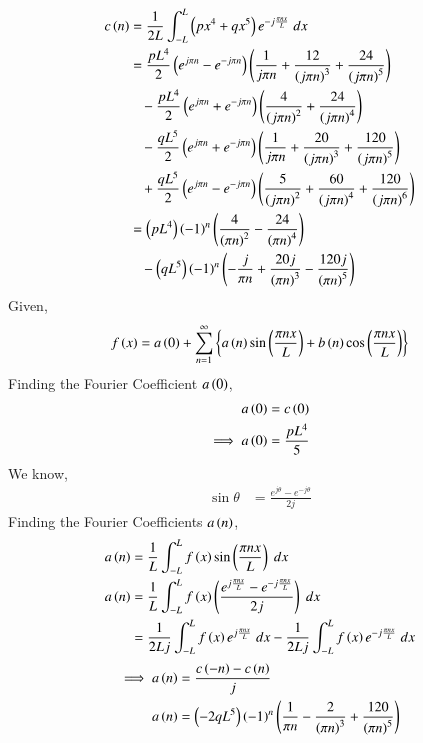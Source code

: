 \documentclass[journal,12pt,twocolumn]{IEEEtran}
\theoremstyle{remark}
\begin{document}
\begin{align}
    c\left(n\right)&=\frac{1}{2L}\int_{-L}^{L}\left(px^4+qx^5\right)e^{-j\frac{\pi n x}{L}}\;dx\label{eq:CE-25.1}\\
    &=\frac{pL^4}{2}\left(e^{j\pi n}-e^{-j\pi n}\right)\left(\frac{1}{j\pi n}+\frac{12}{\left(j\pi n\right)^3}+\frac{24}{\left(j\pi n\right)^5}\right)\notag\\
    &\;\;\;-\frac{pL^4}{2}\left(e^{j\pi n}+e^{-j\pi n}\right)\left(\frac{4}{\left(j\pi n\right)^2}+\frac{24}{\left(j\pi n\right)^4}\right)\notag\\
    &\;\;\;-\frac{qL^5}{2}\left(e^{j\pi n}+e^{-j\pi n}\right)\left(\frac{1}{j\pi n}+\frac{20}{\left(j\pi n\right)^3}+\frac{120}{\left(j\pi n\right)^5}\right)\notag\\
    &\;\;\;+\frac{qL^5}{2}\left(e^{j\pi n}-e^{-j\pi n}\right)\left(\frac{5}{\left(j\pi n\right)^2}+\frac{60}{\left(j\pi n\right)^4}+\frac{120}{\left(j\pi n\right)^6}\right)\\
    &=\left(pL^4\right)\left(-1\right)^n\left(\frac{4}{\left(\pi n\right)^2}-\frac{24}{\left(\pi n\right)^4}\right)\notag\\
    &\;\;\;-\left(qL^5\right)\left(-1\right)^n\left(-\frac{j}{{\pi n}}+\frac{20j}{\left(\pi n\right)^3}-\frac{120j}{\left(\pi n\right)^5}\right)
\end{align}
Given,
\begin{align}
    f\left(x\right)=a\left(0\right)+\sum_{n=1}^{\infty}\left\{a\left(n\right)\sin\left(\frac{\pi n x}{L}\right)+b\left(n\right)\cos\left(\frac{\pi n x}{L}\right)\right\}
\end{align}
Finding the Fourier Coefficient $a\left(0\right)$,
\begin{align}
    a\left(0\right)&=c\left(0\right)\\
    \implies a\left(0\right)&=\frac{pL^4}{5}
\end{align}
We know,
\begin{align}
    \sin \theta&=\frac{e^{j\theta}-e^{-j\theta}}{2j}
\end{align}
Finding the Fourier Coefficients $a\left(n\right)$,
\begin{align}
    a\left(n\right)&=\frac{1}{L}\int_{-L}^{L}f\left(x\right)\sin\left(\frac{\pi nx}{L}\right)\;dx\\
    a\left(n\right)&=\frac{1}{L}\int_{-L}^{L}f\left(x\right)\left(\frac{e^{j\frac{\pi n x}{L}}-e^{-j\frac{\pi n x}{L}}}{2j}\right)\;dx\\
    &=\frac{1}{2Lj}\int_{-L}^{L}f\left(x\right)e^{j\frac{\pi n x}{L}}\;dx-\frac{1}{2Lj}\int_{-L}^{L}f\left(x\right)e^{-j\frac{\pi n x}{L}}\;dx
\end{align}
\begin{align}
    \implies a\left(n\right)&=\frac{c\left(-n\right)-c\left(n\right)}{j}\\
    a\left(n\right)&=\left(-2qL^5\right)\left(-1\right)^{n}\left(\frac{1}{\pi n}-\frac{2}{\left(\pi n\right)^3}+\frac{120}{\left(\pi n\right)^5}\right)
\end{align}
\end{document}
